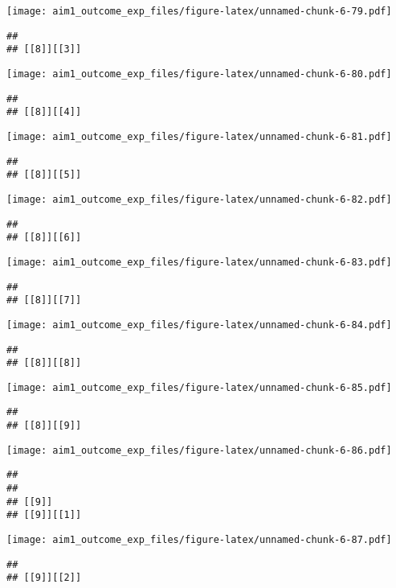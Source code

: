 \documentclass[
]{article}
\begin{document}
\texttt{[image: aim1\_outcome\_exp\_files/figure-latex/unnamed-chunk-6-79.pdf]}

\begin{verbatim}
## 
## [[8]][[3]]
\end{verbatim}

\texttt{[image: aim1\_outcome\_exp\_files/figure-latex/unnamed-chunk-6-80.pdf]}

\begin{verbatim}
## 
## [[8]][[4]]
\end{verbatim}

\texttt{[image: aim1\_outcome\_exp\_files/figure-latex/unnamed-chunk-6-81.pdf]}

\begin{verbatim}
## 
## [[8]][[5]]
\end{verbatim}

\texttt{[image: aim1\_outcome\_exp\_files/figure-latex/unnamed-chunk-6-82.pdf]}

\begin{verbatim}
## 
## [[8]][[6]]
\end{verbatim}

\texttt{[image: aim1\_outcome\_exp\_files/figure-latex/unnamed-chunk-6-83.pdf]}

\begin{verbatim}
## 
## [[8]][[7]]
\end{verbatim}

\texttt{[image: aim1\_outcome\_exp\_files/figure-latex/unnamed-chunk-6-84.pdf]}

\begin{verbatim}
## 
## [[8]][[8]]
\end{verbatim}

\texttt{[image: aim1\_outcome\_exp\_files/figure-latex/unnamed-chunk-6-85.pdf]}

\begin{verbatim}
## 
## [[8]][[9]]
\end{verbatim}

\texttt{[image: aim1\_outcome\_exp\_files/figure-latex/unnamed-chunk-6-86.pdf]}

\begin{verbatim}
## 
## 
## [[9]]
## [[9]][[1]]
\end{verbatim}

\texttt{[image: aim1\_outcome\_exp\_files/figure-latex/unnamed-chunk-6-87.pdf]}

\begin{verbatim}
## 
## [[9]][[2]]
\end{verbatim}
\end{document}
